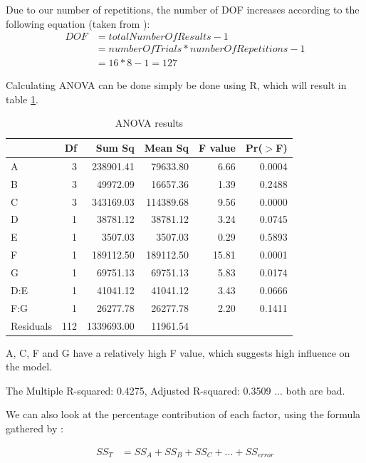 Due to our number of repetitions, the number of DOF increases according to the following equation (taken from \cite{roy_primer_1990}):
\begin{equation} \label{full DOF}
	\begin{split}
		DOF & = totalNumberOfResults - 1 \\
		& = numberOfTrials * numberOfRepetitions - 1 \\
		& = 16 * 8 - 1 = 127
	\end{split}
\end{equation}


Calculating ANOVA can be done simply be done using R, which will result in table \ref{table:taguchi:anova_results}.

\begin{table}[ht]
	\centering
	\begin{tabular}{lrrrrr}
		\hline
		& Df & Sum Sq & Mean Sq & F value & Pr($>$F) \\ 
		\hline
		A & 3 & 238901.41 & 79633.80 & 6.66 & 0.0004 \\ 
		B & 3 & 49972.09 & 16657.36 & 1.39 & 0.2488 \\ 
		C & 3 & 343169.03 & 114389.68 & 9.56 & 0.0000 \\ 
		D & 1 & 38781.12 & 38781.12 & 3.24 & 0.0745 \\ 
		E & 1 & 3507.03 & 3507.03 & 0.29 & 0.5893 \\ 
		F & 1 & 189112.50 & 189112.50 & 15.81 & 0.0001 \\ 
		G & 1 & 69751.13 & 69751.13 & 5.83 & 0.0174 \\ 
		D:E & 1 & 41041.12 & 41041.12 & 3.43 & 0.0666 \\ 
		F:G & 1 & 26277.78 & 26277.78 & 2.20 & 0.1411 \\ 
		Residuals & 112 & 1339693.00 & 11961.54 &  &  \\ 
		\hline
	\end{tabular}
	\caption{ANOVA results}
	\label{table:taguchi:anova_results}
\end{table}

A, C, F and G have a relatively high F value, which suggests high influence on the model. 

The Multiple R-squared:  0.4275,	Adjusted R-squared:  0.3509 ... both are bad.


We can also look at the percentage contribution of each factor, using the formula gathered by \cite{yang_design_2009}:

\begin{equation} \label{equation:taguchi:ss_t}
	\begin{split}
		SS_T & = SS_A + SS_B + SS_C + ... + SS_{error}
	\end{split}
\end{equation}

